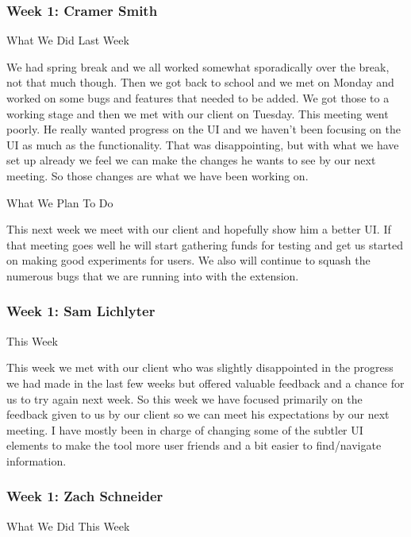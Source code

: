  \subsubsection{Week 1: Cramer Smith}

What We Did Last Week



We had spring break and we all worked somewhat sporadically over the break, not that much though. Then we got back to school and we met on Monday and worked on some bugs and features that needed to be added. We got those to a working stage and then we met with our client on Tuesday. This meeting went poorly. He really wanted progress on the UI and we haven't been focusing on the UI as much as the functionality. That was disappointing, but with what we have set up already we feel we can make the changes he wants to see by our next meeting. So those changes are what we have been working on.



What We Plan To Do 



This next week we meet with our client and hopefully show him a better UI. If that meeting goes well he will start gathering funds for testing and get us started on making good experiments for users. We also will continue to squash the numerous bugs that we are running into with the extension. \\ 

 \subsubsection{Week 1: Sam Lichlyter}

This Week

This week we met with our client who was slightly disappointed in the progress we had made in the last few weeks but offered valuable feedback and a chance for us to try again next week. So this week we have focused primarily on the feedback given to us by our client so we can meet his expectations by our next meeting. I have mostly been in charge of changing some of the subtler UI elements to make the tool more user friends and a bit easier to find/navigate information. \\ 

 \subsubsection{Week 1: Zach Schneider}

What We Did This Week

